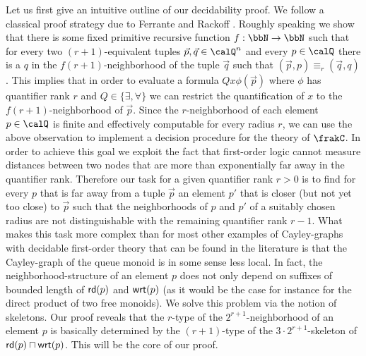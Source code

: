 Let us first give an intuitive outline of our decidability proof. We follow a classical proof strategy due to Ferrante and Rackoff \cite{FerR79}. Roughly speaking  we show that there is some fixed primitive recursive function $f:\bbN \to \bbN$ such that for every
two $({r+1})$-equivalent tuples $\vec{p},\vec{q} \in \Qx^n$ and every $p\in \Qx$ there is a $q$ in the $f(r+1)$-neighborhood of the tuple $\vec{q}$ such that $(\vec{p},p) \equiv_r (\vec{q}, q)$.
This implies that in order to evaluate a formula $Qx\phi(\vec{p})$ where $\phi$ has quantifier rank $r$ and $Q\in\{\exists,\forall\}$  we can restrict the quantification of $x$ to the $f(r+1)$-neighborhood of $\vec{p}$. Since the
$r$-neighborhood of each element $p\in \Qx$ is finite and effectively computable for every radius $r$, we can use the above observation to implement a decision procedure for the theory of $\frakC$.   
In order to achieve this goal we exploit the fact that first-order logic cannot measure distances between two nodes that are more than exponentially far away in the quantifier rank. Therefore our task for a given quantifier rank $r>0$ is to find for every $p$ that is far away from a tuple $\vec{p}$ an element $p'$ that is closer (but not yet too close) to $\vec{p}$ such that the neighborhoods of $p$ and $p'$ of a suitably chosen radius are not distinguishable with the remaining quantifier rank $r-1$. What makes this task more complex than for most other examples of Cayley-graphs with decidable first-order theory that can be found in the literature is that the Cayley-graph of the queue monoid is in some sense less local.
In fact, the neighborhood-structure of an element $p$ does not only depend on suffixes of  bounded length of $\mathsf{rd}(p)$ and $\mathsf{wrt}(p)$ (as it would be the case for instance for the direct product of two free monoids). We solve this problem via the notion of skeletons. Our proof 
reveals that   the $r$-type of the $2^{r+1}$-neighborhood of an element $p$ is basically determined by the $(r+1)$-type of the $3\cdot 2^{r+1}$-skeleton of $\mathsf{rd}(p) \sqcap \mathsf{wrt}(p)$. This will be the core
of our proof.

